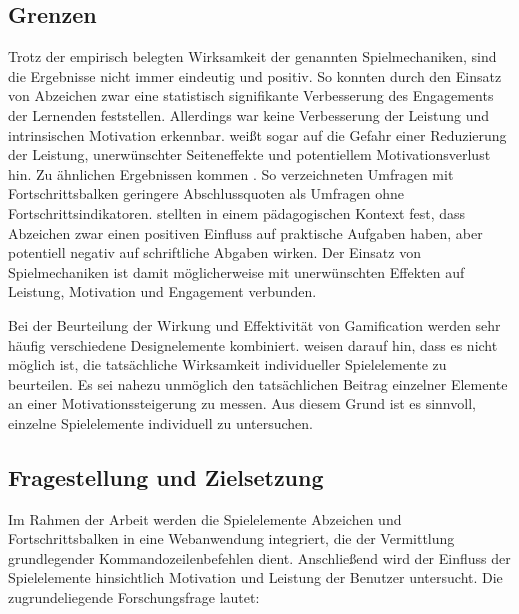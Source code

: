 \subsection{Grenzen}
Trotz der empirisch belegten Wirksamkeit der genannten Spielmechaniken, sind die Ergebnisse nicht immer eindeutig und positiv.
So konnten \citeauthor{ortiz_gamification_2017} durch den Einsatz von Abzeichen zwar eine statistisch signifikante Verbesserung des Engagements der Lernenden feststellen.
Allerdings war keine Verbesserung der Leistung und intrinsischen Motivation erkennbar.
\citeauthor{toda_dark_2018} weißt sogar auf die Gefahr einer Reduzierung der Leistung, unerwünschter Seiteneffekte und potentiellem Motivationsverlust hin.
Zu ähnlichen Ergebnissen kommen \citeauthor{liu_examining_2017}.
So verzeichneten Umfragen mit Fortschrittsbalken geringere Abschlussquoten als Umfragen ohne Fortschrittsindikatoren. \citeauthor{dominguez_gamifying_2013} stellten in einem pädagogischen Kontext fest, dass Abzeichen zwar einen positiven Einfluss auf praktische Aufgaben haben, aber potentiell negativ auf schriftliche Abgaben wirken. Der Einsatz von Spielmechaniken ist damit möglicherweise mit unerwünschten Effekten auf Leistung, Motivation und Engagement verbunden.

Bei der Beurteilung der Wirkung und Effektivität von Gamification werden sehr häufig verschiedene Designelemente kombiniert. \citeauthor{mazarakis2018gamification} weisen darauf hin, dass es nicht möglich ist, die tatsächliche Wirksamkeit individueller Spielelemente zu beurteilen. Es sei nahezu unmöglich den tatsächlichen Beitrag einzelner Elemente an einer Motivationssteigerung zu messen. Aus diesem Grund ist es sinnvoll, einzelne Spielelemente individuell zu untersuchen.



\subsection{Fragestellung und Zielsetzung}

Im Rahmen der Arbeit werden die Spielelemente Abzeichen und Fortschrittsbalken in eine Webanwendung integriert, die der Vermittlung grundlegender Kommandozeilenbefehlen dient.
Anschließend wird der Einfluss der Spielelemente hinsichtlich Motivation und Leistung der Benutzer untersucht.
Die zugrundeliegende Forschungsfrage lautet:

